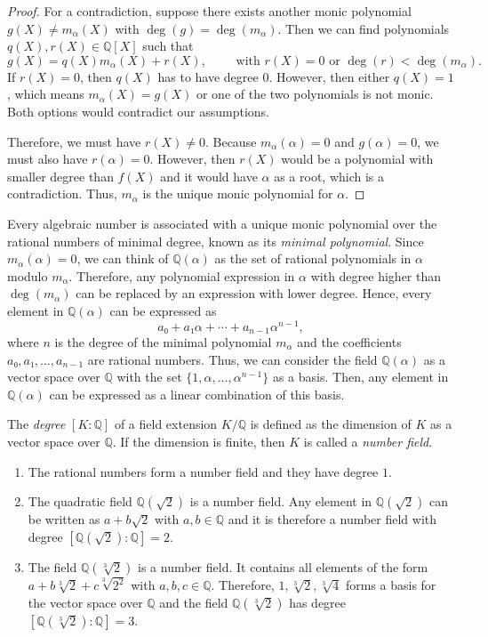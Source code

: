\begin{proof}
  For a contradiction, suppose there exists another monic polynomial $g(X) ≠
  m_α(X)$ with $\deg(g) = \deg(m_α)$.
  Then we can find polynomials $q(X), r(X) ∈ ℚ[X]$ such that
  \[
    g(X) = q(X) m_α(X) + r(X), \qquad \text{ with } r(X) = 0 \text{ or } \deg(r) < \deg(m_α).
  \]
  If $r(X) = 0$, then $q(X)$ has to have degree $0$.
  However, then either $q(X) = 1$, which means $m_α(X) = g(X)$ or one of
  the two polynomials is not monic.
  Both options would contradict our assumptions.

  Therefore, we must have $r(X) ≠ 0$.
  Because $m_α(α) = 0$ and $g(α) = 0$, we must also have $r(α) = 0$.
  However, then $r(X)$ would be a polynomial with smaller degree than $f(X)$
  and it would have $α$ as a root, which is a contradiction.
  Thus, $m_α$ is the unique monic polynomial for $α$.
\end{proof}

Every algebraic number is associated with a unique monic polynomial over the rational numbers
of minimal degree, known as its \emph{minimal polynomial}.
Since $m_α(α) = 0$,
we can think of $ℚ(α)$ as the set of rational polynomials in $α$ modulo $m_α$.
Therefore, any polynomial expression in $α$ with degree higher than $\deg(m_α)$
can be replaced by an expression with lower degree.
Hence, every element in $ℚ(α)$ can be expressed as
\[
  a₀ + a₁ α + ⋯ + a_{n-1} α^{n-1},
\]
where $n$ is the degree of the minimal polynomial $m_α$
and the coefficients $a₀, a₁, …, a_{n-1}$ are rational numbers.
Thus,
we can consider the field $ℚ(α)$ as a vector space over $ℚ$
with the set $\{1, α, …, α^{n-1}\}$ as a basis.
Then,
any element in $ℚ(α)$ can be expressed as a linear combination of this basis.

\begin{definition}
  The \emph{degree} $[K : ℚ]$ of a field extension $K/ℚ$ is defined as the
  dimension of $K$ as a vector space over $ℚ$.
  If the dimension is finite, then $K$ is called a \emph{number field}.
\end{definition}

\begin{example}
  \hfill
  \begin{enumerate}
    \item The rational numbers form a number field and they have degree $1$.
    \item The quadratic field $ℚ(\sqrt{2})$ is a number field.
      Any element in $ ℚ(\sqrt{2})$ can be written as $a + b \sqrt{2}$ with $a,b ∈ ℚ$
      and it is therefore a number field with degree $[ℚ(\sqrt{2}) : ℚ] = 2$.
    \item The field $ℚ(\sqrt[3]{2})$ is a number field.
      It contains all elements of the form $a + b \sqrt[3]{2} + c \sqrt[3]{2^2}$ with $a,b,c ∈ ℚ$.
      Therefore, $1, \sqrt[3]{{2}}, \sqrt[3]{4}$ forms a basis for the vector space over $ℚ$
      and the field $ℚ(\sqrt[3]{2})$ has degree $[ℚ(\sqrt[3]{2}) : ℚ] = 3$.
  \end{enumerate}
\end{example}

